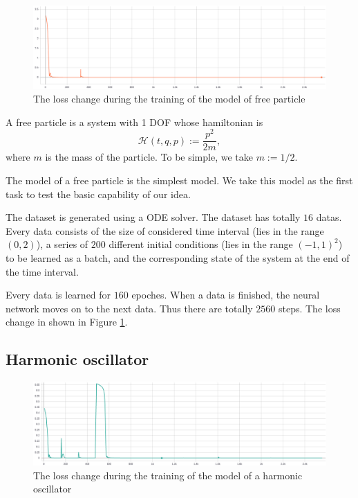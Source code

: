 \documentclass{article}
\begin{document}
\begin{figure}[h]
	\centering
	\includegraphics[width=\linewidth]{free_loss.png}
	\caption{The loss change during the training of the model of free particle}
	\label{fig:free_loss}
\end{figure}

A free particle is a system with 1 DOF whose hamiltonian is \cite[p. 133]{landau1976mechanics}\cite[p. 66]{arnold1989mathmech}
\begin{equation*}
	\mathcal H\left(t,q,p\right):=\frac{p^2}{2m},
\end{equation*}
where $m$ is the mass of the particle.
To be simple, we take $m:=1/2$.

The model of a free particle is the simplest model.
We take this model as the first task to test the basic capability of our idea.

The dataset is generated using a ODE solver.
The dataset has totally $16$ datas.
Every data consists of the size of considered time interval
(lies in the range $\left(0,2\right)$),
a series of $200$ different initial conditions
(lies in the range $\left(-1,1\right)^2$)
to be learned as a batch,
and the corresponding state of the system at the end of the time interval.

Every data is learned for $160$ epoches.
When a data is finished, the neural network moves on to the next data.
Thus there are totally $2560$ steps.
The loss change in shown in Figure \ref{fig:free_loss}.

\subsection{Harmonic oscillator}

\begin{figure}[h]
	\centering
	\includegraphics[width=\linewidth]{spring_loss.png}
	\caption{The loss change during the training of the model of a harmonic oscillator}
	\label{fig:spring_loss}
\end{figure}
\end{document}
